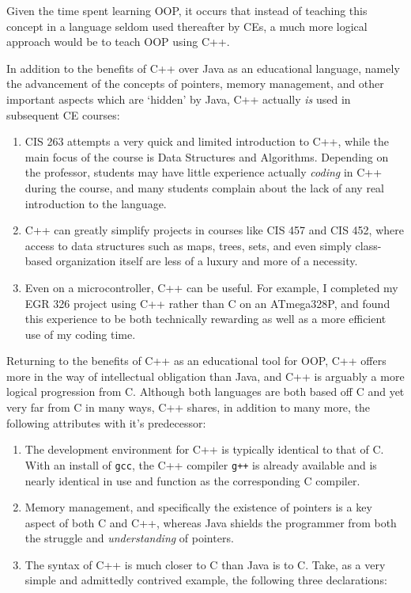 \documentclass[12pt]{article}
\numberwithin{figure}{section}
\numberwithin{equation}{section}
\begin{document}
{\bigskip

Given the time spent learning OOP, it occurs that instead of teaching
this concept in a language seldom used thereafter by CEs, a much more
logical approach would be to teach OOP using C++.

\bigskip

In addition to the benefits of C++ over Java as an educational language,
namely the advancement of the concepts of pointers, memory management,
and other important aspects which are `hidden' by Java, C++ actually
\emph{is} used in subsequent CE courses:

\begin{enumerate}
\item   CIS 263 attempts a very quick and limited introduction to C++, while
        the main focus of the course is Data Structures and Algorithms.
        Depending on the professor, students may have little experience
        actually \emph{coding} in C++ during the course, and many students
        complain about the lack of any real introduction to the language.
\item   C++ can greatly simplify projects in courses like CIS 457 and CIS 452,
        where access to data structures such as maps, trees, sets, and even
        simply class-based organization itself are less of a luxury and more
        of a necessity.
\item   Even on a microcontroller, C++ can be useful. For example, I completed
        my EGR 326 project using C++ rather than C on an ATmega328P, and found
        this experience to be both technically rewarding as well as a more
        efficient use of my coding time.
\end{enumerate}

Returning to the benefits of C++ as an educational tool for OOP, C++
offers more in the way of intellectual obligation than Java, and C++ is
arguably a more logical progression from C. Although both languages are
both based off C and yet very far from C in many ways, C++ shares, in
addition to many more, the following attributes with it's predecessor:

\begin{enumerate}
\item   The development environment for C++ is typically identical to that of
        C. With an install of \texttt{gcc}, the C++ compiler \texttt{g++} is
        already available and is nearly identical in use and function as the
        corresponding C compiler.
\item   Memory management, and specifically the existence of pointers is a key
        aspect of both C and C++, whereas Java shields the programmer from
        both the struggle and \emph{understanding} of pointers.
\item   The syntax of C++ is much closer to C than Java is to C. Take, as a
        very simple and admittedly contrived example, the following three
        declarations:


\end{enumerate}}
\end{document}
